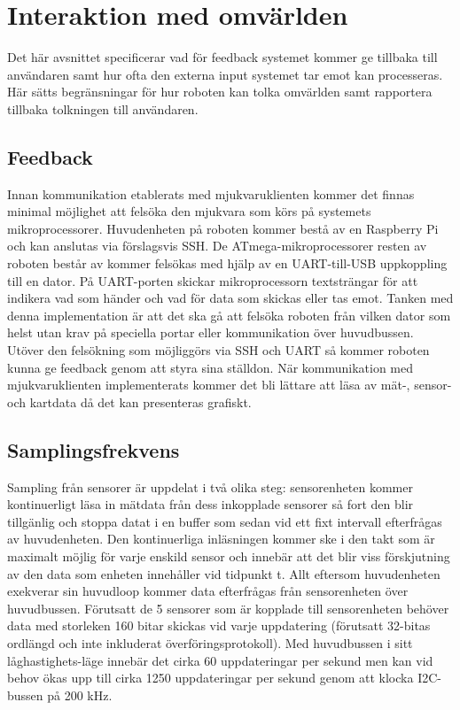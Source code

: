 \documentclass{article}
\begin{document}
\clearpage

\section{Interaktion med omvärlden}
Det här avsnittet specificerar vad för feedback systemet kommer ge tillbaka till användaren samt hur ofta den externa input systemet tar emot kan processeras. Här sätts begränsningar för hur roboten kan tolka omvärlden samt rapportera tillbaka tolkningen till användaren.

\subsection{Feedback}
Innan kommunikation etablerats med mjukvaruklienten kommer det finnas minimal möjlighet att felsöka den mjukvara som körs på systemets mikroprocessorer. Huvudenheten på roboten kommer bestå av en Raspberry Pi och kan anslutas via förslagsvis SSH. De ATmega-mikroprocessorer resten av roboten består av kommer felsökas med hjälp av en UART-till-USB uppkoppling till en dator. På UART-porten skickar mikroprocessorn textsträngar för att indikera vad som händer och vad för data som skickas eller tas emot. Tanken med denna implementation är att det ska gå att felsöka roboten från vilken dator som helst utan krav på speciella portar eller kommunikation över huvudbussen.
\newline\newline
Utöver den felsökning som möjliggörs via SSH och UART så kommer roboten kunna ge feedback genom att styra sina ställdon. När kommunikation med mjukvaruklienten implementerats kommer det bli lättare att läsa av mät-, sensor- och kartdata då det kan presenteras grafiskt.

\subsection{Samplingsfrekvens}
\label{sec:samplingsfrekvens}
Sampling från sensorer är uppdelat i två olika steg: sensorenheten kommer kontinuerligt läsa in mätdata från dess inkopplade sensorer så fort den blir tillgänlig och stoppa datat i en buffer som sedan vid ett fixt intervall efterfrågas av huvudenheten. Den kontinuerliga inläsningen kommer ske i den takt som är maximalt möjlig för varje enskild sensor och innebär att det blir viss förskjutning av den data som enheten innehåller vid tidpunkt t. Allt eftersom huvudenheten exekverar sin huvudloop kommer data efterfrågas från sensorenheten över huvudbussen. Förutsatt de 5 sensorer som är kopplade till sensorenheten behöver data med storleken 160 bitar skickas vid varje uppdatering (förutsatt 32-bitas ordlängd och inte inkluderat överföringsprotokoll). Med huvudbussen i sitt låghastighets-läge innebär det cirka 60 uppdateringar per sekund men kan vid behov ökas upp till cirka 1250 uppdateringar per sekund genom att klocka I2C-bussen på 200 kHz.


\clearpage

\nocite{*}
{}

\end{document}
